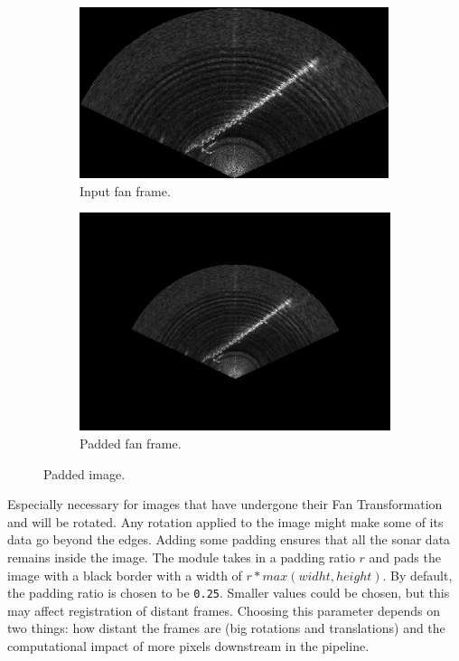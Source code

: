 \begin{figure}[H]
    \centering
    \begin{subfigure}[b]{.45\textwidth}
        \centering
        \includegraphics[width=\textwidth]{figures/pipeline/Fan.png}
        \caption{Input fan frame.}
    \end{subfigure}
    \hfill
    \begin{subfigure}[b]{.45\textwidth}
        \centering
        \includegraphics[width=\textwidth]{figures/pipeline/Padding.png}
        \caption{Padded fan frame.}
    \end{subfigure}
    \caption{Padded image.}
\end{figure}

Especially necessary for images that have undergone their Fan Transformation and will be rotated. Any rotation applied to the image might make some of its data go beyond the edges. Adding some padding ensures that all the sonar data remains inside the image. The module takes in a padding ratio \(r\) and pads the image with a black border with a width of \(r * max(widht, height)\). By default, the padding ratio is chosen to be \texttt{0.25}. Smaller values could be chosen, but this may affect registration of distant frames. Choosing this parameter depends on two things: how distant the frames are (big rotations and translations) and the computational impact of more pixels downstream in the pipeline.

